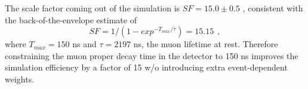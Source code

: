 The scale factor coming out of the simulation is $SF = 15.0 \pm 0.5$ , consistent with the back-of-the-envelope
estimate of
$$
            SF = 1/(1 - exp^{-T_{max}/\tau}) = 15.15 ~~,
$$
where $T_{max} = 150$ ns and $\tau = 2197$ ns, the muon lifetime at rest.
Therefore constraining the muon proper decay time in the detector to 150 ns improves the simulation efficiency
by a factor of 15 w/o introducing extra event-dependent weights.

